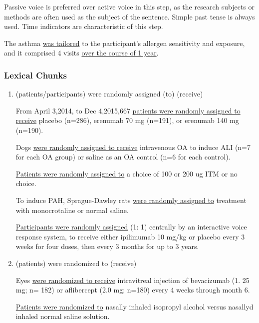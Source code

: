 \documentclass{ctexbook}
\begin{document}
    Passive voice is preferred over active voice in this step, as the research subjects or methods are often used as the subject of the sentence. Simple past tense is always used. Time indicators are characteristic of this step.

    \begin{eg}{}
      The asthma  \uline{was tailored} to the participant's allergen sensitivity and exposure, and it comprised 4 visits \uline{over the course of 1 year}.
    \end{eg}

    \subsubsection{Lexical Chunks}

    \begin{enumerate}
      \item (patients/participants) were randomly assigned (to) (receive)
      \begin{eg}{}
        From April 3,2014, to Dec 4,2015,667 \uline{patients were randomly assigned to receive} placebo (n=286), erenumab 70 mg (n=191), or erenumab 140 mg (n=190).
      \end{eg}

      \begin{eg}{}
        Dogs \uline{were randomly assigned to receive} intravenous OA to induce ALI (n=7 for each OA group) or saline as an OA control (n=6 for each control).
      \end{eg}

      \begin{eg}{}
        \uline{Patients were randomly assigned to} a choice of 100 or 200 ug ITM or no choice.
      \end{eg}

      \begin{eg}{}
        To induce PAH, Sprague-Dawley rats \uline{were randomly assigned to} treatment with monocrotaline or normal saline.
      \end{eg}

      \begin{eg}{}
        \uline{Participants were randomly assigned} (1: 1) centrally by an interactive voice response system, to receive either ipilimumab 10 mg/kg or placebo every 3 weeks for four doses, then every 3 months for up to 3 years.
      \end{eg}
      
      \item (patients) were randomized to (receive)
      \begin{eg}{}
        Eyes \uline{were randomized to receive} intravitreal injection of bevacizumab (1. 25 mg; n= 182) or aflibercept (2.0 mg; n=180) every 4 weeks through month 6.
      \end{eg}
      \begin{eg}{}
        \uline{Patients were randomized to} nasally inhaled isopropyl alcohol versus nasallyd inhaled normal saline solution.
      \end{eg}


\end{enumerate}
\end{document}
